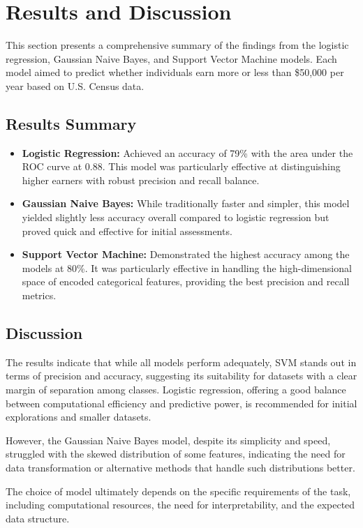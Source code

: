 \documentclass[12pt]{article}
\begin{document}
\section{Results and Discussion}
This section presents a comprehensive summary of the findings from the logistic regression, Gaussian Naive Bayes, and Support Vector Machine models. Each model aimed to predict whether individuals earn more or less than \$50,000 per year based on U.S. Census data.

\subsection{Results Summary}
\begin{itemize}
    \item \textbf{Logistic Regression:} Achieved an accuracy of 79\% with the area under the ROC curve at 0.88. This model was particularly effective at distinguishing higher earners with robust precision and recall balance.
    \item \textbf{Gaussian Naive Bayes:} While traditionally faster and simpler, this model yielded slightly less accuracy overall compared to logistic regression but proved quick and effective for initial assessments.
    \item \textbf{Support Vector Machine:} Demonstrated the highest accuracy among the models at 80\%. It was particularly effective in handling the high-dimensional space of encoded categorical features, providing the best precision and recall metrics.
\end{itemize}

\subsection{Discussion}
The results indicate that while all models perform adequately, SVM stands out in terms of precision and accuracy, suggesting its suitability for datasets with a clear margin of separation among classes. Logistic regression, offering a good balance between computational efficiency and predictive power, is recommended for initial explorations and smaller datasets.

However, the Gaussian Naive Bayes model, despite its simplicity and speed, struggled with the skewed distribution of some features, indicating the need for data transformation or alternative methods that handle such distributions better.

The choice of model ultimately depends on the specific requirements of the task, including computational resources, the need for interpretability, and the expected data structure.
\end{document}
